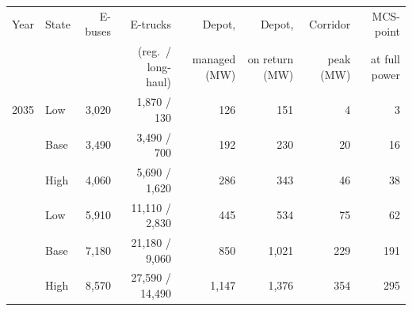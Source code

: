 \begin{tabular}{@{}llrrrrrr@{}}
\toprule
Year & State & E-buses & E-trucks & Depot, & Depot, & Corridor & MCS-point \\
 & & & (reg.\ / long-haul) & managed (MW) & on return (MW) & peak (MW) & at full power \\
\midrule
2035 & Low & 3,020 & 1,870 / 130 & 126 & 151 & 4 & 3 \\
 & Base & 3,490 & 3,490 / 700 & 192 & 230 & 20 & 16 \\
 & High & 4,060 & 5,690 / 1,620 & 286 & 343 & 46 & 38 \\
\addlinespace
2050 & Low & 5,910 & 11,110 / 2,830 & 445 & 534 & 75 & 62 \\
 & Base & 7,180 & 21,180 / 9,060 & 850 & 1,021 & 229 & 191 \\
 & High & 8,570 & 27,590 / 14,490 & 1,147 & 1,376 & 354 & 295 \\
\bottomrule
\end{tabular}
